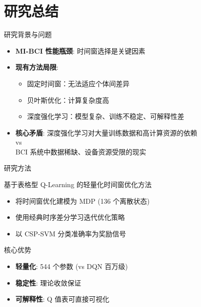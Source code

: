 
\section{研究总结}

\begin{frame}{研究背景与问题}
    \begin{itemize}
        \item \textbf{MI-BCI 性能瓶颈}: 时间窗选择是关键因素
        \item \textbf{现有方法局限}:
        \begin{itemize}
            \item 固定时间窗：无法适应个体间差异
            \item 贝叶斯优化：计算复杂度高
            \item 深度强化学习：模型复杂、训练不稳定、可解释性差
        \end{itemize}
        \item \textbf{核心矛盾}: 深度强化学习对大量训练数据和高计算资源的依赖 \\
        vs \\
        BCI 系统中数据稀缺、设备资源受限的现实
    \end{itemize}
\end{frame}

\begin{frame}{研究方法}
    \begin{block}{基于表格型 Q-Learning 的轻量化时间窗优化方法}
        \begin{itemize}
            \item 将时间窗优化建模为 MDP (136 个离散状态)
            \item 使用经典时序差分学习迭代优化策略
            \item 以 CSP-SVM 分类准确率为奖励信号
        \end{itemize}
    \end{block}
    
    \vspace{0.3cm}
    \begin{exampleblock}{核心优势}
        \begin{itemize}
            \item \textbf{轻量化}: 544 个参数 (vs DQN 百万级)
            \item \textbf{稳定性}: 理论收敛保证
            \item \textbf{可解释性}: Q 值表可直接可视化
        \end{itemize}
    \end{exampleblock}
\end{frame}

